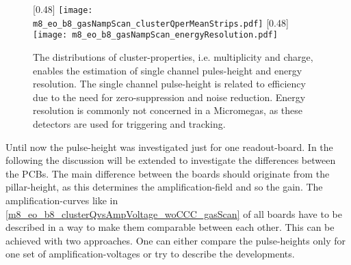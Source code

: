\documentclass[
twoside,            %
BCOR1.4cm,          %
10pt,               %
headings=normal,    %
headsepline,        %
clearplainpage,		%
final,              %
div=14,
open=right,
bibliography=toc
]{scrreprt}
\begin{document}
\begin{figure}[!h]
	\centering
	[0.48\textwidth]
	{\texttt{[image: m8\_eo\_b8\_gasNampScan\_clusterQperMeanStrips.pdf]}}
	\hfill
	[0.48\textwidth]
	{\texttt{[image: m8\_eo\_b8\_gasNampScan\_energyResolution.pdf]}}
	\vspace{-2mm}
	\caption{
		The distributions of cluster-properties, i.e. multiplicity and charge, enables the estimation of single channel pules-height and energy resolution.
		The single channel pulse-height is related to efficiency due to the need for zero-suppression and noise reduction.
		Energy resolution is commonly not concerned in a Micromegas, as these detectors are used for triggering and tracking.
	}
	\label{m8_eo_b8_gasNampScan_chargeSharingNresolution} 
\end{figure}

Until now the pulse-height was investigated just for one readout-board.
In the following the discussion will be extended to investigate the differences between the PCBs.
The main difference between the boards should originate from the pillar-height, as this determines the amplification-field and so the gain.
The amplification-curves like in \ref{m8_eo_b8_clusterQvsAmpVoltage_woCCC_gasScan} of all boards have to be described in a way to make them comparable between each other.
This can be achieved with two approaches.
One can either compare the pulse-heights only for one set of amplification-voltages or try to describe the developments.
\end{document}
